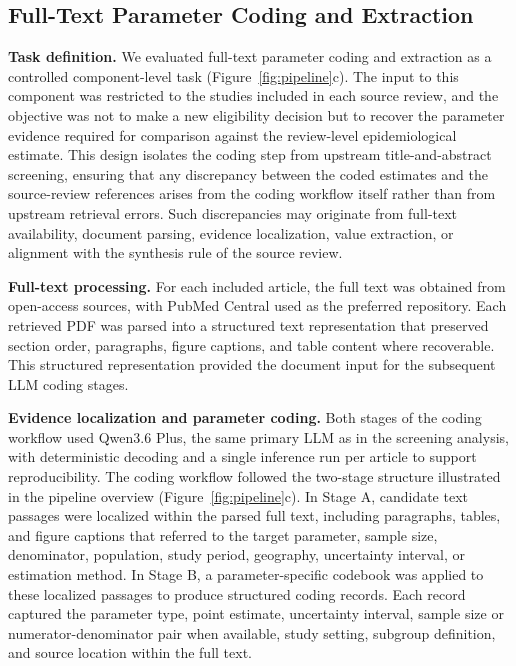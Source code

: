 \subsection{Full-Text Parameter Coding and Extraction}

\textbf{Task definition.}
We evaluated full-text parameter coding and extraction as a controlled component-level task (Figure~\ref{fig:pipeline}c). The input to this component was restricted to the studies included in each source review, and the objective was not to make a new eligibility decision but to recover the parameter evidence required for comparison against the review-level epidemiological estimate. This design isolates the coding step from upstream title-and-abstract screening, ensuring that any discrepancy between the coded estimates and the source-review references arises from the coding workflow itself rather than from upstream retrieval errors. Such discrepancies may originate from full-text availability, document parsing, evidence localization, value extraction, or alignment with the synthesis rule of the source review.

\textbf{Full-text processing.}
For each included article, the full text was obtained from open-access sources, with PubMed Central used as the preferred repository. Each retrieved PDF was parsed into a structured text representation that preserved section order, paragraphs, figure captions, and table content where recoverable. This structured representation provided the document input for the subsequent LLM coding stages.

\textbf{Evidence localization and parameter coding.}
Both stages of the coding workflow used Qwen3.6 Plus, the same primary LLM as in the screening analysis, with deterministic decoding and a single inference run per article to support reproducibility. The coding workflow followed the two-stage structure illustrated in the pipeline overview (Figure~\ref{fig:pipeline}c). In Stage A, candidate text passages were localized within the parsed full text, including paragraphs, tables, and figure captions that referred to the target parameter, sample size, denominator, population, study period, geography, uncertainty interval, or estimation method. In Stage B, a parameter-specific codebook was applied to these localized passages to produce structured coding records. Each record captured the parameter type, point estimate, uncertainty interval, sample size or numerator-denominator pair when available, study setting, subgroup definition, and source location within the full text.

